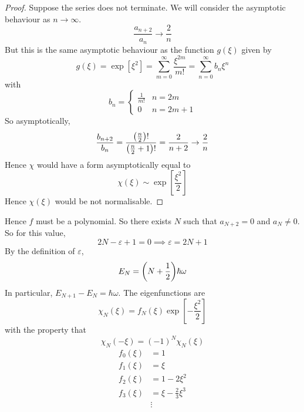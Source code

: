 \begin{proof}
	Suppose the series does not terminate.
	We will consider the asymptotic behaviour as \( n \to \infty \).
	\[
		\frac{a_{n+2}}{a_n} \to \frac{2}{n}
	\]
	But this is the same asymptotic behaviour as the function \( g(\xi) \) given by
	\[
		g(\xi) = \exp[\xi^2] = \sum_{m=0}^\infty \frac{\xi^{2m}}{m!} = \sum_{n=0}^\infty b_n \xi^n
	\]
	with
	\[
		b_n = \begin{cases}
			\frac{1}{m!} & n = 2m     \\
			0            & n = 2m + 1
		\end{cases}
	\]
	So asymptotically,
	\[
		\frac{b_{n+2}}{b_n} = \frac{\qty(\frac{n}{2})!}{\qty(\frac{n}{2} + 1)!} = \frac{2}{n+2} \to \frac{2}{n}
	\]
	Hence \( \chi \) would have a form asymptotically equal to
	\[
		\chi(\xi) \sim \exp[\frac{\xi^2}{2}]
	\]
	Hence \( \chi(\xi) \) would be not normalisable.
\end{proof}
Hence \( f \) must be a polynomial.
So there exists \( N \) such that \( a_{N+2} = 0 \) and \( a_N \neq 0 \).
So for this value,
\[
	2N - \varepsilon + 1 = 0 \implies \varepsilon = 2N + 1
\]
By the definition of \( \varepsilon \),
\[
	E_N = \qty(N + \frac{1}{2}) \hbar \omega
\]
In particular, \( E_{N+1} - E_N = \hbar \omega \).
The eigenfunctions are
\[
	\chi_N(\xi) = f_N(\xi) \exp[-\frac{\xi^2}{2}]
\]
with the property that
\[
	\chi_N(-\xi) = (-1)^N \chi_N(\xi)
\]
\begin{align*}
	f_0(\xi) & = 1                      \\
	f_1(\xi) & = \xi                    \\
	f_2(\xi) & = 1 - 2 \xi^2            \\
	f_3(\xi) & = \xi - \frac{2}{3}\xi^3 \\
	         & \vdots
\end{align*}
